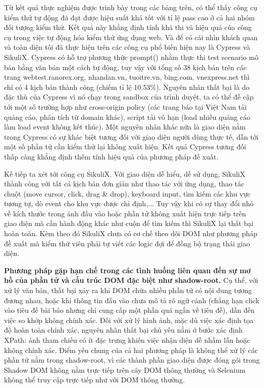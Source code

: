 \documentclass[a4paper, 12pt]{report}
\begin{document}
{Từ kết quả thực nghiệm được trình bày trong các bảng trên, có thể thấy công cụ kiểm thử tự động đã đạt được hiệu suất khá tốt với tỉ lệ pass cao ở cả hai nhóm đối tượng kiểm thử. Kết quả này khẳng định tính khả thi và hiệu quả của công cụ trong việc tự động hóa kiểm thử ứng dụng web. Và để có cái nhìn khách quan và toàn diện tôi đã thực hiện trên các công cụ phổ biến hiện nay là Cypress và SikuliX. Cypress có hỗ trợ phương thức prompt() nhằm thực thi test scenario mô bản bằng văn bản một cách tự động, tuy vậy với tổng số 38 kịch bản trên các trang webtest.ranorex.org, nhandan.vn, tuoitre.vn, bing.com, vnexpress.net thì chỉ có 4 kịch bản thành công (chiếm tỉ lệ 10.53\%). Nguyên nhân thất bại là do đặc thù của Cypress vì nó chạy trong sandbox của trình duyệt, ta có thể đề cập tới một số trường hợp như cross-origin policy (các trang báo tại Việt Nam tải quảng cáo, phân tích từ domain khác), script tải vô hạn (load nhiều quảng cáo làm load event không kết thúc). Một nguyên nhân khác nữa là giao diện nằm trong Cypress có sự khác biệt tương đối với giao diện người dùng thực tế, dẫn tới một số phần tử cần kiểm thử lại không xuất hiện. Kết quả Cypress tương đối thấp càng khẳng định thêm tính hiệu quả của phương pháp đề xuất.



Kế tiếp ta xét tới công cụ SikuliX. Với giao diện dễ hiểu, dễ sử dụng, SikuliX thành công với tất cả kịch bản đơn giản như thao tác với ứng dụng, thao tác chuột (move cursor, click, drag \& drop), keyboard input, tìm kiếm các khu vực tương tự, dò event cho khu vực được chỉ định,... Tuy vậy khi có sự thay đổi nhỏ về kích thước trong ảnh đầu vào hoặc phần tử không xuất hiện trực tiếp trên giao diện mà cần hành động khác như cuộn để tìm kiếm thì SikuliX lại thất bại hoàn toàn. Kèm theo đó SikuliX chưa có cơ chế theo dõi DOM như phương pháp đề xuất mà kiểm thử viên phải tự viết các logic đợi để đồng bộ trạng thái giao diện.



\textbf{Phương pháp gặp hạn chế trong các tình huống liên quan đến sự mơ hồ của phần tử và cấu trúc DOM đặc biệt như shadow-root.} Cụ thể, với xử lý văn bản, thất bại xảy ra khi DOM chứa nhiều phần tử có nội dung tương đương nhau, hoặc khi thông tin đầu vào chưa mô tả rõ ngữ cảnh (chẳng hạn click vào tiêu đề bài báo nhưng chỉ cung cấp một phần quá ngắn về tiêu đề), dẫn đến việc so khớp không chính xác. Đối với xử lý hình ảnh, mặc dù việc xác định tọa độ hoàn toàn chính xác, nguyên nhân thất bại chủ yếu nằm ở bước xác định XPath: ảnh tham chiếu có ít đặc trưng khiến việc nhận diện dễ nhầm lẫn hoặc không chính xác. Điểm yếu chung của cả hai phương pháp là không thể xử lý các phần tử nằm trong shadow-root, vì các thành phần giao diện được đóng gói trong Shadow DOM không nằm trực tiếp trên cây DOM thông thường và Selenium không thể truy cập trực tiếp như với DOM thông thường.







}
\end{document}

